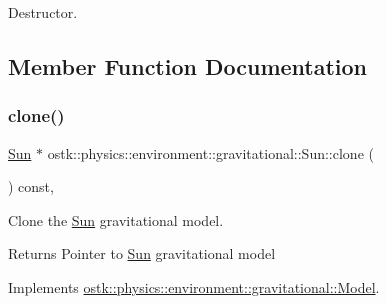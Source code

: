 Destructor. 



\subsection{Member Function Documentation}
\mbox{\label{classostk_1_1physics_1_1environment_1_1gravitational_1_1_sun_aa884bdf367fcbe7aa81289cc077c9dad}} 
\subsubsection{\texorpdfstring{clone()}{clone()}}
{\footnotesize\ttfamily \hyperlink{classostk_1_1physics_1_1environment_1_1gravitational_1_1_sun}{Sun} $\ast$ ostk\+::physics\+::environment\+::gravitational\+::\+Sun\+::clone (\begin{DoxyParamCaption}{ }\end{DoxyParamCaption}) const\hspace{0.3cm}{\ttfamily [override]}, {\ttfamily [virtual]}}



Clone the \hyperlink{classostk_1_1physics_1_1environment_1_1gravitational_1_1_sun}{Sun} gravitational model. 

\begin{DoxyReturn}{Returns}
Pointer to \hyperlink{classostk_1_1physics_1_1environment_1_1gravitational_1_1_sun}{Sun} gravitational model 
\end{DoxyReturn}


Implements \hyperlink{classostk_1_1physics_1_1environment_1_1gravitational_1_1_model_a399257ac86e7f0112a702141e0e2e4a7}{ostk\+::physics\+::environment\+::gravitational\+::\+Model}.

\mbox{\label{classostk_1_1physics_1_1environment_1_1gravitational_1_1_sun_ac8aac491e31bde1690f5d85c7c5fe590}} 
